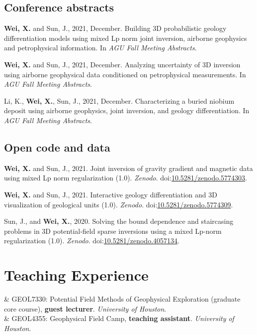 \documentclass[11pt, a4paper]{article}
\newcommand{\LastName}{Wei}
\newcommand{\Initials}{X}
\newcommand{\Wei}{\textbf{\LastName, \Initials.}}  %
\newcommand{\WeiSun}{\textbf{\LastName, \Initials.} and Sun, J.}  %
\newcommand{\Year}[1]{\fontsize{10pt}{0}\selectfont #1}
\newcommand{\DOI}[1]{doi:\href{https://doi.org/#1}{#1}}
\begin{document}
\subsection*{Conference abstracts}
\begin{etaremune}

	\item
	\WeiSun, 2021, December. Building 3D probabilistic geology differentiation models using mixed Lp norm joint inversion, airborne geophysics and petrophysical information. In \emph{AGU Fall Meeting Abstracts}.

	\item
	\WeiSun, 2021, December. Analyzing uncertainty of 3D inversion using airborne geophysical data conditioned on petrophysical measurements. In \emph{AGU Fall Meeting Abstracts}.

	\item
	Li, K., \Wei, Sun, J., 2021, December. Characterizing a buried niobium deposit using airborne geophysics, joint inversion, and geology differentiation. In \emph{AGU Fall Meeting Abstracts}.

\end{etaremune}


\subsection*{Open code and data}
\begin{etaremune}

	\item
	\WeiSun, 2021. Joint inversion of gravity gradient and magnetic data using mixed Lp norm regularization (1.0). \emph{Zenodo}. \DOI{10.5281/zenodo.5774303}.

	\item
	\WeiSun, 2021. Interactive geology differentiation and 3D visualization of geological units (1.0). \emph{Zenodo}. \DOI{10.5281/zenodo.5774309}.

	\item
	Sun, J., and \Wei, 2020. Solving the bound dependence and staircasing problems in 3D potential-field sparse inversions using a mixed Lp-norm regularization (1.0). \emph{Zenodo}. \DOI{10.5281/zenodo.4057134}.

\end{etaremune}




\section*{Teaching Experience}
\begin{EntriesTable}

	\Year{2020}  &
	GEOL7330: Potential Field Methods of Geophysical Exploration (graduate core course), \textbf{guest lecturer}. \emph{University of Houston}.
	\\
	\Year{2019}  &
	GEOL4355: Geophysical Field Camp, \textbf{teaching assistant}. \emph{University of Houston}.

\end{EntriesTable}
\end{document}
